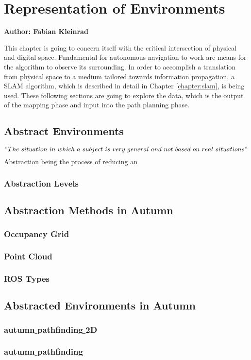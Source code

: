 \chapter{Representation of Environments}

\textbf{Author: Fabian Kleinrad} 

This chapter is going to concern itself with the critical intersection of physical and digital space. Fundamental for autonomous navigation to work are means for the algorithm to observe its surrounding. In order to accomplish a translation from physical space to a medium tailored towards information propagation, a SLAM algorithm, which is described in detail in Chapter \ref{chapter:slam}, is being used. These following sections are going to explore the data, which is the output of the mapping phase and input into the path planning phase.

\section{Abstract Environments}

\["The\ situation\ in\ which\ a\ subject\ is\ very\ general \ and\ not\ based\ on\ real\ situations"\]
Abstraction being the process of reducing an 


\subsection{Abstraction Levels}

\section{Abstraction Methods in Autumn}

\subsection{Occupancy Grid}

\subsection{Point Cloud}

\subsection{ROS Types}

\section{Abstracted Environments in Autumn}

\subsection{autumn$\_$pathfinding$\_$2D}

\subsection{autumn$\_$pathfinding}
